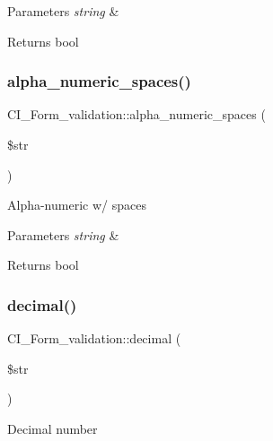 \begin{DoxyParams}{Parameters}
{\em string} & \\
\hline
\end{DoxyParams}
\begin{DoxyReturn}{Returns}
bool 
\end{DoxyReturn}
\mbox{\label{class_c_i___form__validation_ab3bf6ec6e90a952f4bda58f9f76fbb77}} 
\subsubsection{\texorpdfstring{alpha\+\_\+numeric\+\_\+spaces()}{alpha\_numeric\_spaces()}}
{\footnotesize\ttfamily C\+I\+\_\+\+Form\+\_\+validation\+::alpha\+\_\+numeric\+\_\+spaces (\begin{DoxyParamCaption}\item[{}]{\$str }\end{DoxyParamCaption})}

Alpha-\/numeric w/ spaces


\begin{DoxyParams}{Parameters}
{\em string} & \\
\hline
\end{DoxyParams}
\begin{DoxyReturn}{Returns}
bool 
\end{DoxyReturn}
\mbox{\label{class_c_i___form__validation_a532dbb64c5e3a5781528fb2d026c9ec1}} 
\subsubsection{\texorpdfstring{decimal()}{decimal()}}
{\footnotesize\ttfamily C\+I\+\_\+\+Form\+\_\+validation\+::decimal (\begin{DoxyParamCaption}\item[{}]{\$str }\end{DoxyParamCaption})}

Decimal number



